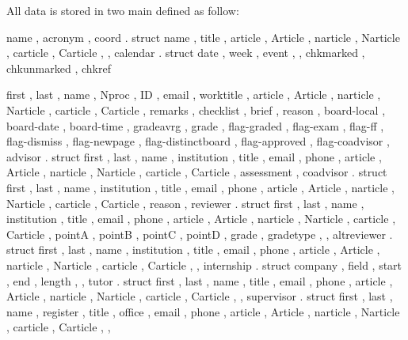 \documentclass[article,nogeometry,english,tocdepth=3,secdepth=3]{ufrgscca} %
\begin{document}
All data is stored in two main  defined as follow:

\begin{codestore}[st=activitydef]
  {
    name , acronym ,
    coord . struct 
      {
        name , title ,
        article , Article , narticle , Narticle , carticle , Carticle ,
      } ,
    calendar . struct
      {
        date ,  week , event ,
      } ,
      chkmarked , chkunmarked , chkref
  }
\end{codestore}

\label{activity-def}


\begin{codestore}[st=studentdef]
 {
  first , last , name , Nproc , ID , email , worktitle ,
        article , Article , narticle , Narticle , carticle , Carticle ,
  remarks , checklist , brief , reason , 
  board-local , board-date , board-time , gradeavrg , grade ,
  flag-graded , %
  flag-exam ,
  flag-ff ,
  flag-dismiss , %
  flag-newpage , %
  flag-distinctboard , %
  flag-approved ,
  flag-coadvisor ,
  advisor . struct {
    first , last , name , institution , title , email , phone ,    
        article , Article , narticle , Narticle , carticle , Carticle ,
    assessment 
  } ,
  coadvisor . struct {
    first , last , name , institution , title , email , phone ,    
        article , Article , narticle , Narticle , carticle , Carticle ,
    reason 
  } ,
  reviewer . struct {
    first , last , name , institution , title , email , phone ,    
        article , Article , narticle , Narticle , carticle , Carticle ,
    pointA , pointB , pointC , pointD , grade , gradetype ,    
  } ,
  altreviewer . struct {
    first , last , name , institution , title , email , phone ,    
        article , Article , narticle , Narticle , carticle , Carticle ,
  } ,
  internship . struct {
    company , field , start , end , length , 
  } ,
  tutor . struct {
    first , last , name , title , email , phone ,    
        article , Article , narticle , Narticle , carticle , Carticle ,
  } ,
  supervisor . struct {
    first , last , name , register , title , office , email , phone ,    
        article , Article , narticle , Narticle , carticle , Carticle ,
  } ,
 }
\end{codestore}
\end{document}
